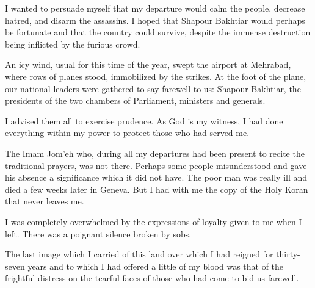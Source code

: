 I wanted to persuade myself that my departure would calm the people, decrease hatred, and disarm the assassins. I hoped that Shapour Bakhtiar would perhaps be fortunate and that the country could survive, despite the immense destruction being inflicted by the furious crowd. 

An icy wind, usual for this time of the year, swept the airport at Mehrabad, where rows of planes stood, immobilized by the strikes. At the foot of the plane, our national leaders were gathered to say farewell to us: Shapour Bakhtiar, the presidents of the two chambers of Parliament, ministers and generals. 

I advised them all to exercise prudence. As God is my witness, I had done everything within my power to protect those who had served me. 

The Imam Jom’eh who, during all my departures had been present to recite the traditional prayers, was not there. Perhaps some people misunderstood and gave his absence a significance which it did not have. The poor man was really ill and died a few weeks later in Geneva. But I had with me the copy of the Holy Koran that never leaves me. 

I was completely overwhelmed by the expressions of loyalty given to me when I left. There was a poignant silence broken by sobs. 


The last image which I carried of this land over which I had reigned for thirty-seven years and to which I had offered a little of my blood was that of the frightful distress on the tearful faces of those who had come to bid us farewell. 